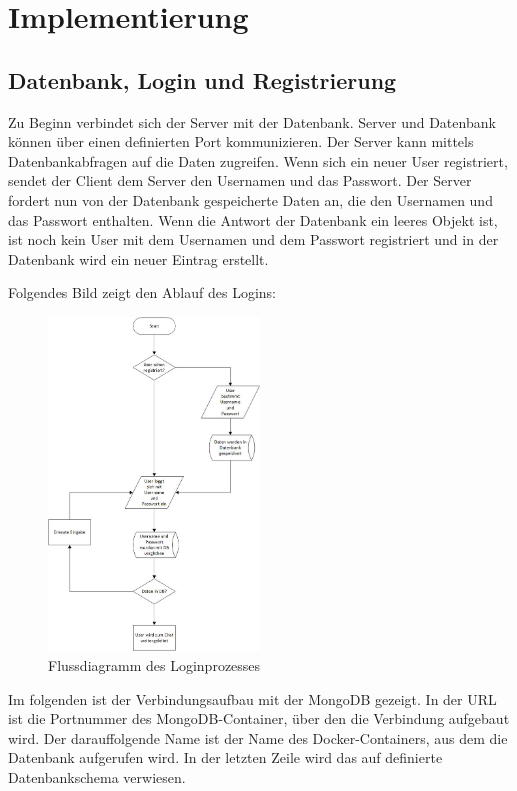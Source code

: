 
\chapter{Implementierung}\label{cha:Implementierung}
\section{Datenbank, Login und Registrierung}\label{Datenbank}
Zu Beginn verbindet sich der Server mit der Datenbank. Server und Datenbank können über einen definierten Port kommunizieren. Der Server kann mittels Datenbankabfragen auf die Daten zugreifen. Wenn sich ein neuer User registriert, sendet der Client dem Server den Usernamen und das Passwort. Der Server fordert nun von der Datenbank gespeicherte Daten an, die den Usernamen und das Passwort enthalten. Wenn die Antwort der Datenbank ein leeres Objekt ist, ist noch kein User mit dem Usernamen und dem Passwort registriert und in der Datenbank wird ein neuer Eintrag erstellt. 

Folgendes Bild zeigt den Ablauf des Logins:
\begin{figure}[H]
\centering
\includegraphics[width=0.5\textwidth]{images/login.jpg}
\caption{Flussdiagramm des Loginprozesses}
\end{figure}

Im folgenden ist der Verbindungsaufbau mit der MongoDB gezeigt. In der URL ist die Portnummer des MongoDB-Container, über den die Verbindung aufgebaut wird. Der darauffolgende Name ist der Name des Docker-Containers, aus dem die Datenbank aufgerufen wird.
In der letzten Zeile wird das auf definierte Datenbankschema verwiesen. 

